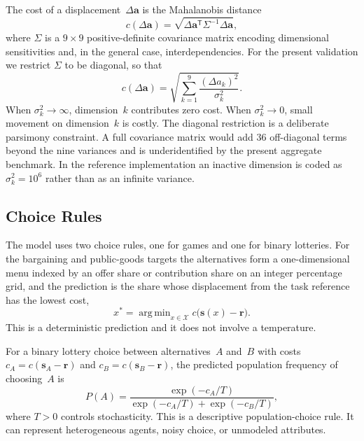 \documentclass[journal]{IEEEtran}
\DeclareMathOperator*{\argmin}{arg\,min}
\begin{document}
The cost of a displacement~$\Delta\mathbf{a}$ is the Mahalanobis distance~\cite{mahalanobis1936}
\begin{equation}
    c(\Delta\mathbf{a}) = \sqrt{\Delta\mathbf{a}^{\mathsf{T}} \Sigma^{-1} \Delta\mathbf{a}},
    \label{eq:mahalanobis}
\end{equation}
where $\Sigma$ is a $9 \times 9$ positive-definite covariance matrix encoding dimensional sensitivities and, in the general case, interdependencies.
For the present validation we restrict $\Sigma$ to be diagonal, so that
\begin{equation}
    c(\Delta\mathbf{a}) = \sqrt{\sum_{k=1}^{9} \frac{(\Delta a_k)^2}{\sigma_k^2}}.
    \label{eq:mahalanobis_diag}
\end{equation}
When $\sigma_k^2 \to \infty$, dimension~$k$ contributes zero cost.
When $\sigma_k^2 \to 0$, small movement on dimension~$k$ is costly.
The diagonal restriction is a deliberate parsimony constraint.
A full covariance matrix would add 36 off-diagonal terms beyond the nine variances and is underidentified by the present aggregate benchmark.
In the reference implementation an inactive dimension is coded as $\sigma_k^2=10^{6}$ rather than as an infinite variance.

\subsection{Choice Rules}

The model uses two choice rules, one for games and one for binary lotteries.
For the bargaining and public-goods targets the alternatives form a one-dimensional menu indexed by an offer share or contribution share on an integer percentage grid, and the prediction is the share whose displacement from the task reference has the lowest cost,
\begin{equation}
    x^{*} = \argmin_{x\in\mathcal{X}} c\bigl(\mathbf{s}(x)-\mathbf{r}\bigr).
    \label{eq:argmin}
\end{equation}
This is a deterministic prediction and it does not involve a temperature.

For a binary lottery choice between alternatives~$A$ and~$B$ with costs $c_A = c(\mathbf{s}_A-\mathbf{r})$ and $c_B = c(\mathbf{s}_B-\mathbf{r})$, the predicted population frequency of choosing~$A$ is
\begin{equation}
    P(A) = \frac{\exp(-c_A/T)}{\exp(-c_A/T) + \exp(-c_B/T)},
    \label{eq:softmax}
\end{equation}
where $T > 0$ controls stochasticity.
This is a descriptive population-choice rule.
It can represent heterogeneous agents, noisy choice, or unmodeled attributes.
\end{document}
